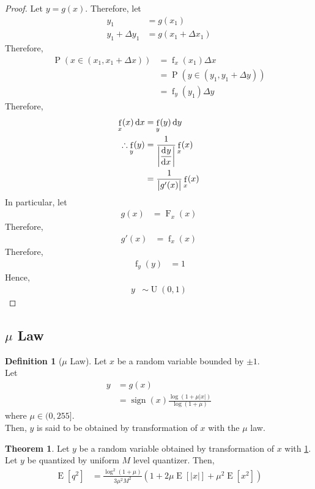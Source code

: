 \documentclass[titlepage, fleqn, a4paper, 12pt, twoside]{article}
\theoremstyle{definition}
\newtheorem{definition}{Definition}
\theoremstyle{theorem}
\newtheorem{theorem}{Theorem}
\DeclareMathOperator{\cdf}{\mathrm{F}}
\DeclareMathOperator{\pdf}{\mathrm{f}}
\DeclareMathOperator{\prob}{\mathrm{P}}
\DeclareMathOperator{\expct}{\mathrm{E}}
\DeclareMathOperator{\uniform}{\mathrm{U}}
\DeclareMathOperator{\sign}{\mathrm{sign}}
\begin{document}
\begin{proof}
	Let $y = g(x)$.
	Therefore, let
	\begin{align*}
		y_1 &= g(x_1)\\
		y_1 + \Delta y_1 &= g(x_1 + \Delta x_1)
	\end{align*}
	Therefore,
	\begin{align*}
		\prob\left( x \in (x_1, x_1 + \Delta x) \right) &= \pdf_x(x_1) \Delta x\\
		&= \prob\left( y \in (y_1, y_1 + \Delta y) \right)\\
		&= \pdf_y(y_1) \Delta y
	\end{align*}
	Therefore,
	\begin{align*}
		\pdf_x(x) \dif x &= \pdf_y(y) \dif y\\
		\therefore \pdf_y(y) &= \frac{1}{\left| \dod{y}{x} \right|} \pdf_x(x)\\
		&= \frac{1}{\left| g'(x) \right|} \pdf_x(x)
	\end{align*}
	In particular, let
	\begin{align*}
		g(x) &= \cdf_x(x)
	\end{align*}
	Therefore,
	\begin{align*}
		g'(x) &= \pdf_x(x)
	\end{align*}
	Therefore,
	\begin{align*}
		\pdf_y(y) &= 1
	\end{align*}
	Hence,
	\begin{align*}
		y &\sim \uniform(0,1)
	\end{align*}
\end{proof}

\subsection{$\mu$ Law}

\begin{definition}[$\mu$ Law]
	Let $x$ be a random variable bounded by $\pm 1$.\\
	Let
	\begin{align*}
		y &= g(x)\\
		&= \sign(x) \frac{\log\left( 1 + \mu |x| \right)}{\log(1 + \mu)}
	\end{align*}
	where $\mu \in (0,255]$.\\
	Then, $y$ is said to be obtained by transformation of $x$ with the $\mu$ law.
	\label{def:mu_law}
\end{definition}

\begin{theorem}
	Let $y$ be a random variable obtained by transformation of $x$ with \cref{def:mu_law}.\\
	Let $y$ be quantized by uniform $M$ level quantizer.
	Then,
	\begin{align*}
		\expct\left[ q^2 \right] &= \frac{\log^2(1 + \mu)}{3 \mu^2 M^2} \left( 1 + 2 \mu \expct\left[ |x| \right] + \mu^2 \expct\left[ x^2 \right] \right)
	\end{align*}
\end{theorem}
\end{document}
